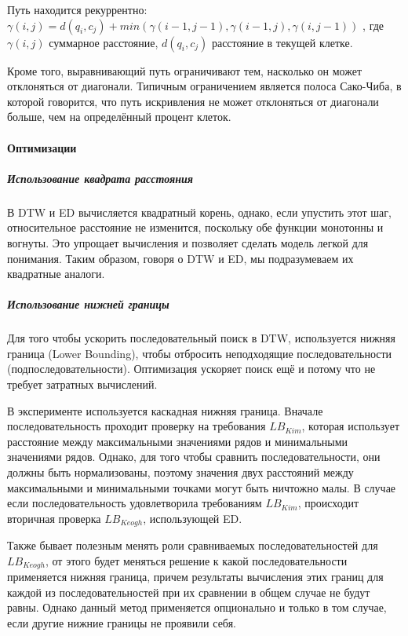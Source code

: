\documentclass[12pt,twoside]{article}
\begin{document}
        Путь находится рекуррентно:\\
            $\gamma(i, j) = d(q_i, c_j) + min({\gamma(i-1, j-1), \gamma(i-1, j), \gamma(i, j-1)})$ ,
            где $\gamma(i, j)$ суммарное расстояние, $d(q_i, c_j)$ расстояние в текущей клетке.
						
                Кроме того, выравнивающий путь ограничивают тем, насколько он может отклоняться от диагонали.
                Типичным ограничением является полоса Сако-Чиба, в которой говорится, что путь искривления не может отклоняться от диагонали больше,
                чем на определённый процент клеток.
						
    \paragraph{Оптимизации}
            
        \subparagraph{Использование квадрата расстояния}	
        В DTW и ED вычисляется квадратный корень, однако, если упустить этот шаг,
        относительное расстояние не изменится, поскольку обе функции монотонны и вогнуты.
        Это упрощает вычисления и позволяет сделать модель легкой для понимания.
        Таким образом, говоря о DTW и ED, мы подразумеваем их квадратные аналоги.
        
        \subparagraph{Использование нижней границы}
        Для того чтобы ускорить последовательный поиск в DTW, используется нижняя граница (Lower Bounding),
        чтобы отбросить неподходящие последовательности (подпоследовательности).
        Оптимизация ускоряет поиск ещё и потому что не требует затратных вычислений.
        
        В эксперименте используется каскадная нижняя граница.
        Вначале последовательность проходит проверку на требования $LB_{Kim}$,
        которая использует расстояние между максимальными значениями рядов и минимальными значениями рядов.
        Однако, для того чтобы сравнить последовательности, они должны быть нормализованы,
        поэтому значения двух расстояний между максимальными и минимальными точками могут быть ничтожно малы.
        В случае если последовательность удовлетворила требованиям $LB_{Kim}$, происходит вторичная проверка $LB_{Keogh}$, использующей ED.
        
        Также бывает полезным менять роли сравниваемых последовательностей для $LB_{Keogh}$,
        от этого будет меняться решение к какой последовательности применяется нижняя граница,
        причем результаты вычисления этих границ для каждой из последовательностей при их сравнении в общем случае не будут равны.
        Однако данный метод применяется опционально и только в том случае, если другие нижние границы не проявили себя.
        
\end{document}
